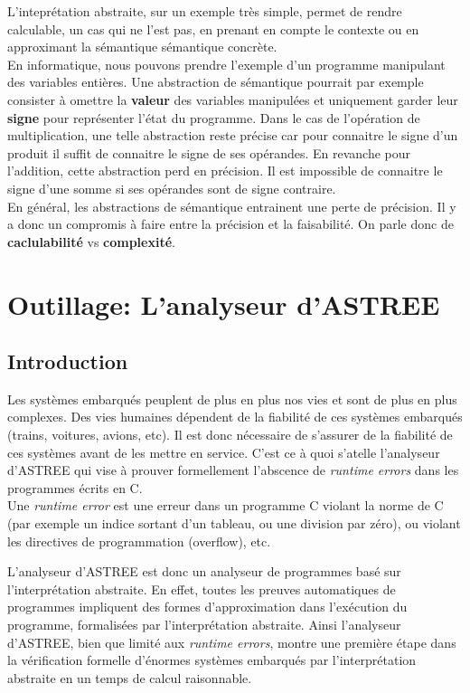 \documentclass[french]{report}
\begin{document}
L'inteprétation abstraite, sur un exemple très simple, permet de rendre calculable, un cas qui ne l'est pas,
en prenant en compte le contexte ou en approximant la sémantique sémantique concrète. \\

En informatique, nous pouvons prendre l'exemple d'un programme manipulant des variables entières. Une abstraction de sémantique pourrait par exemple consister à omettre la \textbf{valeur} des variables manipulées et uniquement garder leur \textbf{signe} pour représenter l'état du programme. Dans le cas de l'opération de multiplication, une telle abstraction reste précise car pour connaitre le signe d'un produit il suffit de connaitre le signe de ses opérandes. En revanche pour l'addition, cette abstraction perd en précision. Il est impossible de connaitre le signe d'une somme si ses opérandes sont de signe contraire.\\

En général, les abstractions de sémantique entrainent une perte de précision. Il y a donc un compromis à faire entre la précision et la faisabilité. On parle donc de \textbf{caclulabilité} vs \textbf{complexité}.


\section{Outillage: L'analyseur d'ASTREE}

\subsection{Introduction}
Les systèmes embarqués peuplent de plus en plus nos vies et sont de plus en plus complexes. Des vies humaines
dépendent de la fiabilité de ces systèmes embarqués (trains, voitures, avions, etc). Il est donc nécessaire de
s'assurer de la fiabilité de ces systèmes avant de les mettre en service.
C'est ce à quoi s'atelle l'analyseur d'ASTREE qui vise à prouver formellement
l'abscence de \textit{runtime errors} dans les programmes écrits en C. \\

Une \textit{runtime error} est une erreur dans un programme C violant la norme de C (par exemple un indice sortant
d'un tableau, ou une division par zéro), ou violant les directives de programmation (overflow), etc.

L'analyseur d'ASTREE est donc un analyseur de programmes basé sur l'interprétation abstraite. En effet, toutes les preuves
automatiques de programmes impliquent des formes d'approximation dans l'exécution du programme, formalisées par
l'interprétation abstraite.
Ainsi l'analyseur d'ASTREE, bien que limité aux \textit{runtime errors}, montre une première étape
dans la vérification formelle d'énormes systèmes embarqués par l'interprétation abstraite en un temps de calcul
raisonnable.
\end{document}
